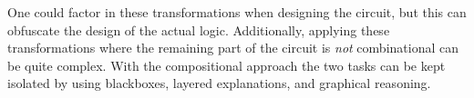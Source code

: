 One could factor in these transformations when designing the circuit, but this
can obfuscate the design of the actual logic.
Additionally, applying these transformations where the remaining part of the
circuit is \emph{not} combinational can be quite complex.
With the compositional approach the two tasks can be kept isolated by using
blackboxes, layered explanations, and graphical reasoning.